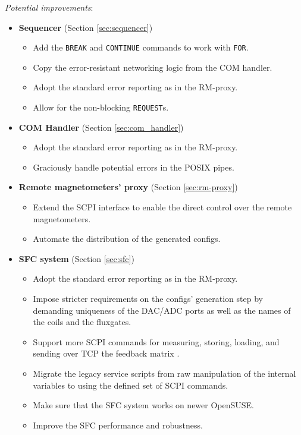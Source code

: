\textit{Potential improvements}:
\begin{itemize}
	\item{
		\textbf{Sequencer} (Section \ref{sec:sequencer})
		\begin{itemize}
			\item Add the \texttt{BREAK} and \texttt{CONTINUE} commands to work with \texttt{FOR}.
			\item Copy the error-resistant networking logic from the COM handler.
			\item Adopt the standard error reporting as in the RM-proxy.
			\item Allow for the non-blocking \texttt{REQUEST}s.
		\end{itemize}
	}
	\item{
		\textbf{COM Handler} (Section \ref{sec:com_handler})
		\begin{itemize}
			\item Adopt the standard error reporting as in the RM-proxy.
			\item Graciously handle potential errors in the POSIX pipes.
		\end{itemize}
	}
	\item{
		\textbf{Remote magnetometers' proxy} (Section \ref{sec:rm-proxy})
		\begin{itemize}
			\item Extend the SCPI interface to enable the direct control over the remote magnetometers.
			\item Automate the distribution of the generated configs.
		\end{itemize}
	}
	\item{
		\textbf{SFC system} (Section \ref{sec:sfc})
		\begin{itemize}
			\item Adopt the standard error reporting as in the RM-proxy.
			\item Impose stricter requirements on the configs' generation step by demanding uniqueness of the DAC/ADC ports as well as the names of the coils and the fluxgates.
			\item Support more SCPI commands for measuring, storing, loading, and sending over TCP the feedback matrix \cite{Franke2013, Rawlik2018a}.
			\item Migrate the legacy service scripts from raw manipulation of the internal variables to using the defined set of SCPI commands.
			\item Make sure that the SFC system works on newer OpenSUSE.
			\item Improve the SFC performance and robustness.
		\end{itemize}
	}
\end{itemize}